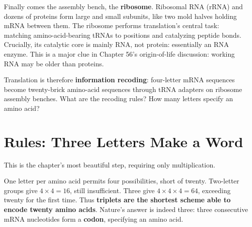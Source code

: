 Finally comes the assembly bench, the \textbf{ribosome}. Ribosomal RNA (rRNA) and dozens of proteins form large and small subunits, like two mold halves holding mRNA between them. The ribosome performs translation's central task: matching amino-acid-bearing tRNAs to positions and catalyzing peptide bonds. Crucially, its catalytic core is mainly RNA, not protein: essentially an RNA enzyme. This is a major clue in Chapter 56's origin-of-life discussion: working RNA may be older than proteins.

\begin{center}
\end{center}

Translation is therefore \textbf{information recoding}: four-letter mRNA sequences become twenty-brick amino-acid sequences through tRNA adapters on ribosome assembly benches. What are the recoding rules? How many letters specify an amino acid?

\section{Rules: Three Letters Make a Word}

This is the chapter's most beautiful step, requiring only multiplication.

One letter per amino acid permits four possibilities, short of twenty. Two-letter groups give $4\times 4=16$, still insufficient. Three give $4\times 4\times 4=64$, exceeding twenty for the first time. Thus \textbf{triplets are the shortest scheme able to encode twenty amino acids}. Nature's answer is indeed three: three consecutive mRNA nucleotides form a \textbf{codon}, specifying an amino acid.

